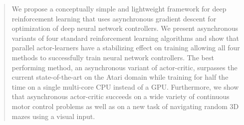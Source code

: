 %
\begin{abstract}

We propose a conceptually simple and lightweight framework for deep reinforcement learning that uses asynchronous gradient descent for optimization of deep neural network controllers.
We present asynchronous variants of four standard reinforcement learning algorithms and show that parallel actor-learners have a stabilizing effect on training allowing all four methods to successfully train neural network controllers.
The best performing method, an asynchronous variant of actor-critic, surpasses the current state-of-the-art on the Atari domain while training for half the time on a single multi-core CPU instead of a GPU.
Furthermore, we show that asynchronous actor-critic succeeds on a wide variety of continuous motor control problems as well as on a new task of navigating random 3D mazes using a visual input.

%

%
%
%

\end{abstract}
